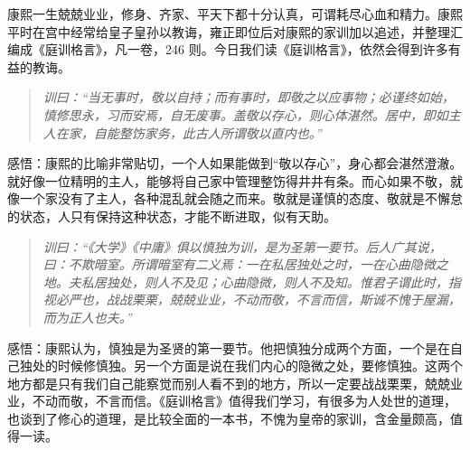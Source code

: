 \begin{book}
    康熙一生兢兢业业，修身、齐家、平天下都十分认真，可谓耗尽心血和精力。康熙平时在宫中经常给皇子皇孙以教诲，雍正即位后对康熙的家训加以追述，并整理汇编成《庭训格言》，凡一卷，246 则。今日我们读《庭训格言》，依然会得到许多有益的教诲。

    \begin{quote}\it
        训曰：“当无事时，敬以自持；而有事时，即敬之以应事物；必谨终如始，慎修思永，习而安焉，自无废事。盖敬以存心，则心体湛然。居中，即如主人在家，自能整饬家务，此古人所谓敬以直内也。”
    \end{quote}

    感悟：康熙的比喻非常贴切，一个人如果能做到“敬以存心”，身心都会湛然澄澈。就好像一位精明的主人，能够将自己家中管理整饬得井井有条。而心如果不敬，就像一个家没有了主人，各种混乱就会随之而来。敬就是谨慎的态度、敬就是不懈怠的状态，人只有保持这种状态，才能不断进取，似有天助。

    \begin{quote}\it
        训曰：“《大学》《中庸》俱以慎独为训，是为圣第一要节。后人广其说，曰：不欺暗室。所谓暗室有二义焉：一在私居独处之时，一在心曲隐微之地。夫私居独处，则人不及见；心曲隐微，则人不及知。惟君子谓此时，指视必严也，战战栗栗，兢兢业业，不动而敬，不言而信，斯诚不愧于屋漏，而为正人也夫。”
    \end{quote}

    感悟：康熙认为，慎独是为圣贤的第一要节。他把慎独分成两个方面，一个是在自己独处的时候修慎独。另一个方面是说在我们内心的隐微之处，要修慎独。这两个地方都是只有我们自己能察觉而别人看不到的地方，所以一定要战战栗栗，兢兢业业，不动而敬，不言而信。《庭训格言》值得我们学习，有很多为人处世的道理，也谈到了修心的道理，是比较全面的一本书，不愧为皇帝的家训，含金量颇高，值得一读。
\end{book}
